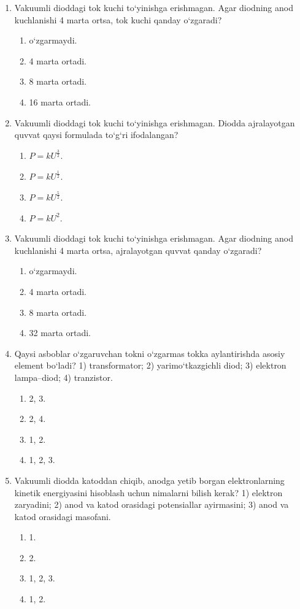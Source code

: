 \begin{enumerate}
\item Vakuumli dioddagi tok kuchi to‘yinishga erishmagan. Agar diodning anod kuchlanishi 4 marta ortsa, tok kuchi qanday o‘zgaradi?
\begin{enumerate}[label=\Alph*)]
\item o‘zgarmaydi.
\item 4 marta ortadi.
\item 8 marta ortadi.
\item 16 marta ortadi.
\end{enumerate}

\item Vakuumli dioddagi tok kuchi to‘yinishga erishmagan. Diodda ajralayotgan quvvat qaysi formulada to‘g‘ri ifodalangan?
\begin{enumerate}[label=\Alph*)]
\item $P = kU^{\frac{3}{2}}$.
\item $P = kU^{\frac{1}{2}}$.
\item $P = kU^{\frac{5}{2}}$.
\item $P = kU^2$.
\end{enumerate}

\item Vakuumli dioddagi tok kuchi to‘yinishga erishmagan. Agar diodning anod kuchlanishi 4 marta ortsa, ajralayotgan quvvat qanday o‘zgaradi?
\begin{enumerate}[label=\Alph*)]
\item o‘zgarmaydi.
\item 4 marta ortadi.
\item 8 marta ortadi.
\item 32 marta ortadi.
\end{enumerate}

\item Qaysi asboblar o‘zgaruvchan tokni o‘zgarmas tokka aylantirishda asosiy element bo‘ladi? 1) transformator; 2) yarimo‘tkazgichli diod; 3) elektron lampa–diod; 4) tranzistor.
\begin{enumerate}[label=\Alph*)]
\item 2, 3.
\item 2, 4.
\item 1, 2.
\item 1, 2, 3.
\end{enumerate}

\item Vakuumli diodda katoddan chiqib, anodga yetib borgan elektronlarning kinetik energiyasini hisoblash uchun nimalarni bilish kerak? 1) elektron zaryadini; 2) anod va katod orasidagi potensiallar ayirmasini; 3) anod va katod orasidagi masofani.
\begin{enumerate}[label=\Alph*)]
\item 1.
\item 2.
\item 1, 2, 3.
\item 1, 2.
\end{enumerate}


\end{enumerate}
